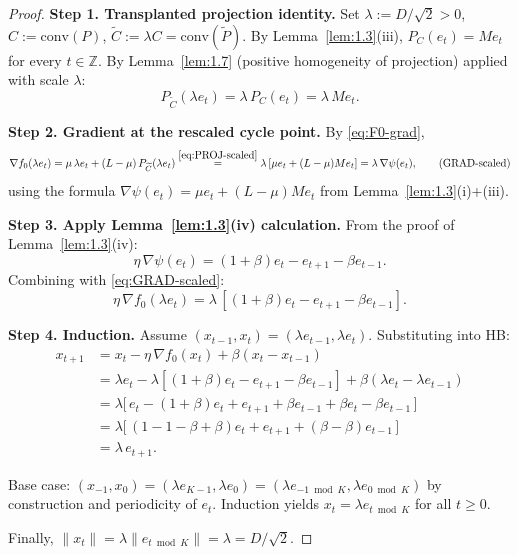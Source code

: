 \documentclass[11pt,a4paper]{article}
\theoremstyle{plain}
\theoremstyle{definition}
\theoremstyle{remark}
\newcommand{\conv}{\mathrm{conv}}
\begin{document}
\begin{proof}
\textbf{Step 1. Transplanted projection identity.} Set $\lambda := D/\sqrt 2 > 0$, $C := \conv(P)$, $\widetilde C := \lambda C = \conv(\widetilde P)$. By Lemma~\ref{lem:1.3}(iii), $P_C(e_t) = M e_t$ for every $t \in \mathbb{Z}$. By Lemma~\ref{lem:1.7} (positive homogeneity of projection) applied with scale $\lambda$:
\begin{equation}
P_{\widetilde C}(\lambda e_t) = \lambda\, P_C(e_t) = \lambda\, M e_t. \tag{PROJ-scaled}\label{eq:PROJ-scaled}
\end{equation}

\textbf{Step 2. Gradient at the rescaled cycle point.} By \eqref{eq:F0-grad},
\begin{equation}
\nabla f_0(\lambda e_t) = \mu\,\lambda e_t + (L - \mu)\, P_{\widetilde C}(\lambda e_t) \stackrel{\eqref{eq:PROJ-scaled}}{=} \lambda\,[\mu e_t + (L-\mu) M e_t] = \lambda\, \nabla \psi(e_t), \tag{GRAD-scaled}\label{eq:GRAD-scaled}
\end{equation}
using the formula $\nabla\psi(e_t) = \mu e_t + (L-\mu) M e_t$ from Lemma~\ref{lem:1.3}(i)+(iii).

\textbf{Step 3. Apply Lemma~\ref{lem:1.3}(iv) calculation.} From the proof of Lemma~\ref{lem:1.3}(iv):
\begin{equation}
\eta\, \nabla \psi(e_t) = (1 + \beta) e_t - e_{t+1} - \beta e_{t-1}. \tag{GRAD-psi}\label{eq:GRAD-psi}
\end{equation}
Combining with \eqref{eq:GRAD-scaled}:
\begin{equation}
\eta\, \nabla f_0(\lambda e_t) = \lambda\,[(1 + \beta) e_t - e_{t+1} - \beta e_{t-1}]. \tag{GRAD-f0}\label{eq:GRAD-f0}
\end{equation}

\textbf{Step 4. Induction.} Assume $(x_{t-1}, x_t) = (\lambda e_{t-1}, \lambda e_t)$. Substituting into HB:
\begin{align*}
x_{t+1} &= x_t - \eta\, \nabla f_0(x_t) + \beta(x_t - x_{t-1}) \\
&= \lambda e_t - \lambda[(1+\beta) e_t - e_{t+1} - \beta e_{t-1}] + \beta (\lambda e_t - \lambda e_{t-1}) \\
&= \lambda\big[\,e_t - (1+\beta) e_t + e_{t+1} + \beta e_{t-1} + \beta e_t - \beta e_{t-1}\,\big] \\
&= \lambda\big[\,(1 - 1 - \beta + \beta) e_t + e_{t+1} + (\beta - \beta) e_{t-1}\,\big] \\
&= \lambda\, e_{t+1}.
\end{align*}

Base case: $(x_{-1}, x_0) = (\lambda e_{K-1}, \lambda e_0) = (\lambda e_{-1 \bmod K}, \lambda e_{0 \bmod K})$ by construction and periodicity of $e_t$. Induction yields $x_t = \lambda e_{t \bmod K}$ for all $t \geq 0$.

Finally, $\|x_t\| = \lambda \|e_{t \bmod K}\| = \lambda = D/\sqrt 2$.
\end{proof}
\end{document}
